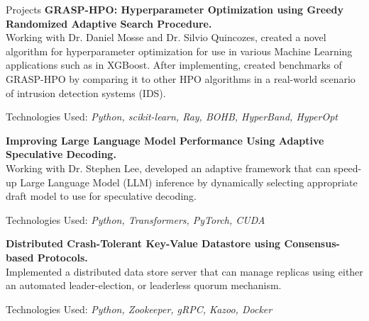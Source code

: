 \begin{rSection}{Projects}
    \textbf{GRASP-HPO: Hyperparameter Optimization using Greedy Randomized Adaptive Search Procedure.}\\
    {Working with Dr. Daniel Mosse and Dr. Silvio Quincozes, created a novel algorithm for hyperparameter optimization for use in various Machine Learning applications such as in XGBoost. After implementing, created benchmarks of GRASP-HPO by comparing it to other HPO algorithms in a real-world scenario of intrusion detection systems (IDS).}
    \begin{description}\vspace{-0.5em}
        \item Technologies Used: \textit{Python, scikit-learn, Ray, BOHB, HyperBand, HyperOpt}
    \end{description}

    \textbf{Improving Large Language Model Performance Using Adaptive Speculative Decoding.}\\
    {Working with Dr. Stephen Lee, developed an adaptive framework that can speed-up Large Language Model (LLM) inference by dynamically selecting appropriate draft model to use for speculative decoding.}
    \begin{description}\vspace{-0.5em}
        \item Technologies Used: \textit{Python, Transformers, PyTorch, CUDA}
    \end{description}

    \textbf{Distributed Crash-Tolerant Key-Value Datastore using Consensus-based Protocols.}\\
    {Implemented a distributed data store server that can manage replicas using either an automated leader-election, or leaderless quorum mechanism.}
    \begin{description}\vspace{-0.5em}
        \item Technologies Used: \textit{Python, Zookeeper, gRPC, Kazoo, Docker}
    \end{description}


\end{rSection}
